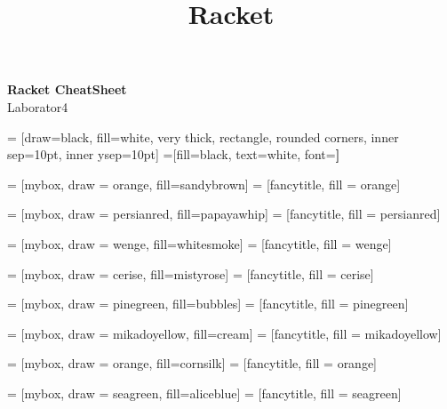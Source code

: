 \documentclass[a4paper]{article}
\title{Racket}
\begin{document}
\begin{center}{\huge{\textbf{Racket CheatSheet}}}\\
{\large Laborator4}
\end{center}
\begin{multicols*}{3}

 = [draw=black, fill=white, very thick,
    rectangle, rounded corners, inner sep=10pt, inner ysep=10pt]
 =[fill=black, text=white, font=\bfseries]

 = [mybox, draw = orange, fill=sandybrown]
 = [fancytitle, fill = orange]


 = [mybox, draw = persianred, fill=papayawhip]
 = [fancytitle, fill = persianred]

 = [mybox, draw = wenge, fill=whitesmoke]
 = [fancytitle, fill = wenge]

 = [mybox, draw = cerise, fill=mistyrose]
 = [fancytitle, fill = cerise]

 = [mybox, draw = pinegreen, fill=bubbles]
 = [fancytitle, fill = pinegreen]

 = [mybox, draw = mikadoyellow, fill=cream]
 = [fancytitle, fill = mikadoyellow]

 = [mybox, draw = orange, fill=cornsilk]
 = [fancytitle, fill = orange]

 = [mybox, draw = seagreen, fill=aliceblue]
 = [fancytitle, fill = seagreen]


\end{multicols*}
\end{document}
